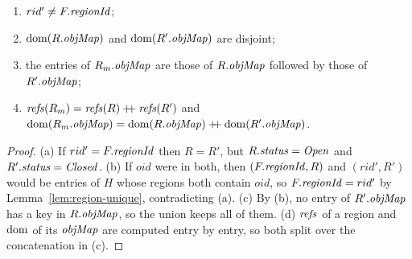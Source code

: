 \begin{lemma}
\label{lem:merge-regions}
\begin{enumerate}[nosep,label=(\alph*)]
  \item $rid' \ne F.\mathit{regionId}$; 
  \item $\mathrm{dom}(R.\mathit{objMap})$ and $\mathrm{dom}(R'.\mathit{objMap})$ are disjoint;
  \item the entries of $R_m.\mathit{objMap}$ are those of $R.\mathit{objMap}$ followed by those of $R'.\mathit{objMap}$;
  \item $\mathit{refs}(R_m) = \mathit{refs}(R) \mathbin{+\!\!+} \mathit{refs}(R')$ and
    $\mathrm{dom}(R_m.\mathit{objMap}) = \mathrm{dom}(R.\mathit{objMap}) \mathbin{+\!\!+} \mathrm{dom}(R'.\mathit{objMap})$.
\end{enumerate}
\end{lemma}
\begin{proof}
(a) If $rid' = F.\mathit{regionId}$ then $R = R'$, but $R.\mathit{status} = \mathit{Open}$ and $R'.\mathit{status} = \mathit{Closed}$.
(b) If $oid$ were in both, then $(F.\mathit{regionId}, R)$ and $(rid', R')$ would be entries of $H$ whose regions
both contain $oid$, so $F.\mathit{regionId} = rid'$ by Lemma~\ref{lem:region-unique}, contradicting (a).
(c) By (b), no entry of $R'.\mathit{objMap}$ has a key in $R.\mathit{objMap}$, so the union keeps all of them.
(d) $\mathit{refs}$ of a region and $\mathrm{dom}$ of its $\mathit{objMap}$ are computed entry by entry, so both split over the
concatenation in (c).
\end{proof}

